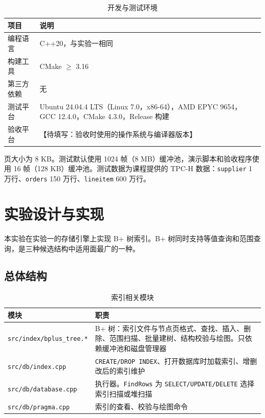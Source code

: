 \documentclass[11pt,a4paper]{ctexart}
\newcommand{\TODO}[1]{\textcolor{todo}{【待填写：#1】}}
\newcommand{\code}[1]{\texttt{#1}}
\begin{document}
\begin{table}[H]
  \centering
  \caption{开发与测试环境}
  \begin{tabularx}{\textwidth}{l X}
    \toprule
    项目 & 说明 \\
    \midrule
    编程语言 & C++20，与实验一相同 \\
    构建工具 & CMake $\geq$ 3.16 \\
    第三方依赖 & 无 \\
    测试平台 & Ubuntu 24.04.4 LTS（Linux 7.0，x86-64），AMD EPYC 9654，GCC 12.4.0，CMake 4.3.0，Release 构建 \\
    验收平台 & \TODO{验收时使用的操作系统与编译器版本} \\
    \bottomrule
  \end{tabularx}
\end{table}

页大小为 8 KB。测试默认使用 1024 帧（8 MB）缓冲池，演示脚本和验收程序使用 16 帧（128 KB）缓冲池。测试数据为课程提供的 TPC-H 数据：\code{supplier} 1 万行、\code{orders} 150 万行、\code{lineitem} 600 万行。

\section{实验设计与实现}

本实验在实验一的存储引擎上实现 B+ 树索引。B+ 树同时支持等值查询和范围查询，是三种候选结构中适用面最广的一种。

\subsection{总体结构}

\begin{table}[H]
  \centering
  \caption{索引相关模块}
  \begin{tabularx}{\textwidth}{l X}
    \toprule
    模块 & 职责 \\
    \midrule
    \code{src/index/bplus\_tree.*} & B+ 树：索引文件与节点页格式、查找、插入、删除、范围扫描、批量建树、结构校验与绘图。只依赖缓冲池和磁盘管理器 \\
    \code{src/db/index.cpp} & \code{CREATE/DROP INDEX}、打开数据库时加载索引、增删改后的索引维护 \\
    \code{src/db/database.cpp} & 执行器。\code{FindRows} 为 \code{SELECT/UPDATE/DELETE} 选择索引扫描或堆扫描 \\
    \code{src/db/pragma.cpp} & 索引的查看、校验与绘图命令 \\
    \bottomrule
  \end{tabularx}
\end{table}
\end{document}
